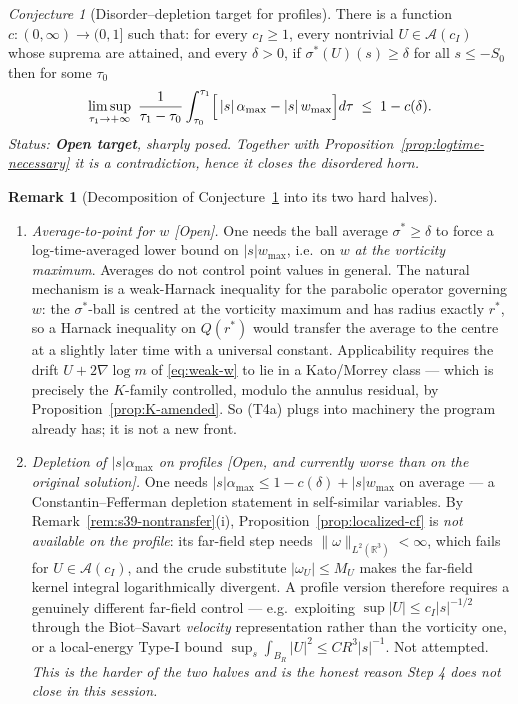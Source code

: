 \documentclass[11pt]{article}
\theoremstyle{definition}
\newtheorem{remark}[theorem]{Remark}
\theoremstyle{remark}
\newtheorem{conjecture}[theorem]{Conjecture}
\newcommand{\R}{\mathbb{R}}
\begin{document}
\begin{conjecture}[Disorder--depletion target for profiles]
  \label{target:disorder-depletion}
  There is a function $c:(0,\infty)\to(0,1]$ such that: for every
  $c_I\geq1$, every nontrivial $U\in\mathcal{A}(c_I)$ whose suprema are
  attained, and every $\delta>0$, if $\sigma^*(U)(s)\geq\delta$ for all
  $s\leq-S_0$ then for some $\tau_0$
  \[
    \limsup_{\tau_1\to+\infty}\ \frac{1}{\tau_1-\tau_0}
    \int_{\tau_0}^{\tau_1}\Bigl[\,|s|\,\alpha_{\max} - |s|\,w_{\max}\Bigr]d\tau
    \;\leq\; 1 - c(\delta).
  \]
  \emph{Status: \textbf{Open target}, sharply posed. Together with
  Proposition~\ref{prop:logtime-necessary} it is a contradiction, hence it
  closes the disordered horn.}
\end{conjecture}

\begin{remark}[Decomposition of Conjecture~\ref{target:disorder-depletion}
  into its two hard halves]\label{rem:target-decomposition}
  \begin{enumerate}[label=(T4\alph*)]
  \item \emph{Average-to-point for $w$ [Open].} One needs the ball average
    $\sigma^*\geq\delta$ to force a log-time-averaged lower bound on
    $|s|w_{\max}$, i.e.\ on $w$ \emph{at the vorticity maximum}. Averages do
    not control point values in general. The natural mechanism is a
    weak-Harnack inequality for the parabolic operator governing $w$: the
    $\sigma^*$-ball is centred at the vorticity maximum and has radius
    exactly $r^*$, so a Harnack inequality on $Q(r^*)$ would transfer the
    average to the centre at a slightly later time with a universal constant.
    Applicability requires the drift $U+2\nabla\log m$ of
    \eqref{eq:weak-w} to lie in a Kato/Morrey class --- which is precisely
    the $K$-family controlled, modulo the annulus residual, by
    Proposition~\ref{prop:K-amended}. So (T4a) plugs into machinery the
    program already has; it is not a new front.
  \item \emph{Depletion of $|s|\alpha_{\max}$ on profiles [Open, and
    currently \emph{worse} than on the original solution].} One needs
    $|s|\alpha_{\max}\leq 1-c(\delta)+|s|w_{\max}$ on average --- a
    Constantin--Fefferman depletion statement in self-similar variables. By
    Remark~\ref{rem:s39-nontransfer}(i), Proposition~\ref{prop:localized-cf}
    is \emph{not available on the profile}: its far-field step needs
    $\|\omega\|_{L^2(\R^3)}<\infty$, which fails for
    $U\in\mathcal{A}(c_I)$, and the crude substitute $|\omega_U|\leq M_U$
    makes the far-field kernel integral logarithmically divergent. A profile
    version therefore requires a genuinely different far-field control ---
    e.g.\ exploiting $\sup|U|\leq c_I|s|^{-1/2}$ through the Biot--Savart
    \emph{velocity} representation rather than the vorticity one, or a
    local-energy Type-I bound $\sup_{s}\int_{B_R}|U|^2\leq CR^3|s|^{-1}$.
    Not attempted. \emph{This is the harder of the two halves and is the
    honest reason Step 4 does not close in this session.}
  \end{enumerate}
\end{remark}
\end{document}
